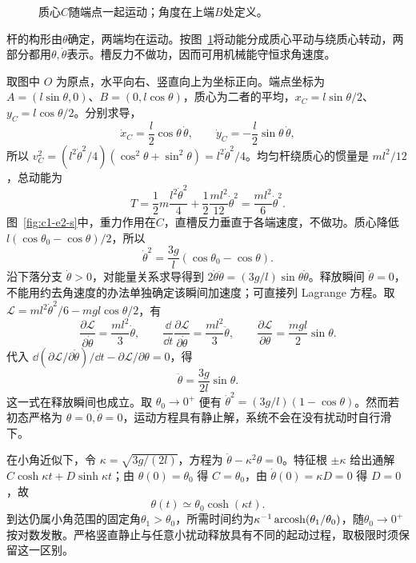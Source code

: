\begin{figure}[H]\centering
{}
\caption{质心$C$随端点一起运动；角度在上端$B$处定义。}\label{fig:c1-e2-q}
\end{figure}
\begin{solution}
杆的构形由$\theta$确定，两端均在运动。按图~\ref{fig:c1-e2-q}将动能分成质心平动与绕质心转动，两部分都用$\theta,\dot\theta$表示。槽反力不做功，因而可用机械能守恒求角速度。


取图中 $O$ 为原点，水平向右、竖直向上为坐标正向。端点坐标为 $A=(l\sin\theta,0)$、$B=(0,l\cos\theta)$，质心为二者的平均，$x_C=l\sin\theta/2$、$y_C=l\cos\theta/2$。分别求导，
\[
\dot x_C=\frac l2\cos\theta\,\dot\theta,\qquad
\dot y_C=-\frac l2\sin\theta\,\dot\theta,
\]
所以 $v_C^2=(l^2\dot\theta^2/4)(\cos^2\theta+\sin^2\theta)=l^2\dot\theta^2/4$。均匀杆绕质心的惯量是 $ml^2/12$，总动能为
\[T=\frac12m\frac{l^2\dot\theta^2}{4}+\frac12\frac{ml^2}{12}\dot\theta^2
=\frac{ml^2}{6}\dot\theta^2.\]
图~\ref{fig:c1-e2-s}中，重力作用在$C$，直槽反力垂直于各端速度，不做功。质心降低$l(\cos\theta_0-\cos\theta)/2$，所以
\[\boxed{\dot\theta^2=\frac{3g}{l}(\cos\theta_0-\cos\theta)}.\]
沿下落分支 $\dot\theta>0$，对能量关系求导得到 $2\dot\theta\ddot\theta=(3g/l)\sin\theta\dot\theta$。释放瞬间 $\dot\theta=0$，不能用约去角速度的办法单独确定该瞬间加速度；可直接列 Lagrange 方程。取 $\mathcal L=ml^2\dot\theta^2/6-mgl\cos\theta/2$，有
\[
\frac{\partial\mathcal L}{\partial\dot\theta}=\frac{ml^2}{3}\dot\theta,\qquad
\frac{\dd}{\dd t}\frac{\partial\mathcal L}{\partial\dot\theta}=\frac{ml^2}{3}\ddot\theta,\qquad
\frac{\partial\mathcal L}{\partial\theta}=\frac{mgl}{2}\sin\theta.
\]
代入 $\dd(\partial\mathcal L/\partial\dot\theta)/\dd t-\partial\mathcal L/\partial\theta=0$，得
\[\boxed{\ddot\theta=\frac{3g}{2l}\sin\theta}.\]
这一式在释放瞬间也成立。取 $\theta_0\to0^+$ 便有 $\dot\theta^2=(3g/l)(1-\cos\theta)$。然而若初态严格为 $\theta=0,\dot\theta=0$，运动方程具有静止解，系统不会在没有扰动时自行滑下。


在小角近似下，令 $\kappa=\sqrt{3g/(2l)}$，方程为 $\ddot\theta-\kappa^2\theta=0$。特征根 $\pm\kappa$ 给出通解 $C\cosh\kappa t+D\sinh\kappa t$；由 $\theta(0)=\theta_0$ 得 $C=\theta_0$，由 $\dot\theta(0)=\kappa D=0$ 得 $D=0$，故
\[\theta(t)\simeq\theta_0\cosh(\kappa t).\]
到达仍属小角范围的固定角$\theta_1>\theta_0$，所需时间约为$\kappa^{-1}\operatorname{arcosh}(\theta_1/\theta_0)$，随$\theta_0\to0^+$按对数发散。严格竖直静止与任意小扰动释放具有不同的起动过程，取极限时须保留这一区别。


\end{solution}
